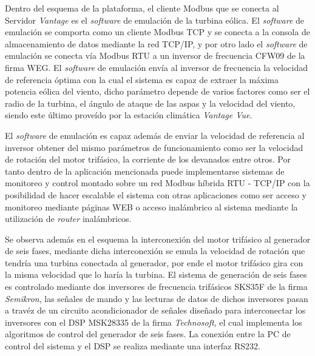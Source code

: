 Dentro del esquema de la plataforma, el cliente Modbus que se conecta al Servidor \textit{Vantage} es el \textit{software} de emulación de la turbina eólica. El \textit{software} de emulación se comporta como un cliente Modbus TCP y se conecta a la consola de almacenamiento de datos mediante la red TCP/IP, y por otro lado el \textit{software} de emulación se conecta vía Modbus RTU a un inversor de frecuencia CFW09 de la firma WEG. El \textit{software} de emulación envía al inversor de frecuencia la velocidad de referencia óptima con la cual el sistema es capaz de extraer la máxima potencia eólica del viento, dicho parámetro depende de varios factores como ser el radio de la turbina, el ángulo de ataque de las aspas y la velocidad del viento, siendo este último proveído por la estación climática \textit{Vantage Vue}.

El \textit{software} de emulación es capaz además de enviar la velocidad de referencia al inversor obtener del mismo parámetros de funcionamiento como ser la velocidad de rotación del motor trifásico, la corriente de los devanados entre otros. Por tanto dentro de la aplicación mencionada puede implementarse sistemas de monitoreo y control montado sobre un red Modbus híbrida RTU - TCP/IP con la posibilidad de hacer escalable el sistema con otras   aplicaciones como ser acceso y monitoreo mediante páginas WEB o acceso inalámbrico al sistema mediante la utilización de \textit{router} inalámbricos.


Se observa además en el esquema la interconexión del motor trifásico al generador de seis fases, mediante dicha interconexión se emula la velocidad de rotación que tendría una turbina  conectada al generador, por ende el motor trifásico gira con la misma velocidad que lo haría la turbina. El sistema de generación de seis fases es controlado mediante dos inversores de frecuencia trifásicos SKS35F de la firma \textit{Semikron}, las señales de mando y las lecturas de datos de dichos inversores pasan a travéz de un circuito acondicionador de señales diseñado para interconectar los inversores con el DSP MSK28335 de la firma \textit{Technosoft}, el cual implementa los algoritmos de control del generador de seis fases. La conexión entre la PC de control del sistema y el DSP se realiza mediante una interfaz RS232.